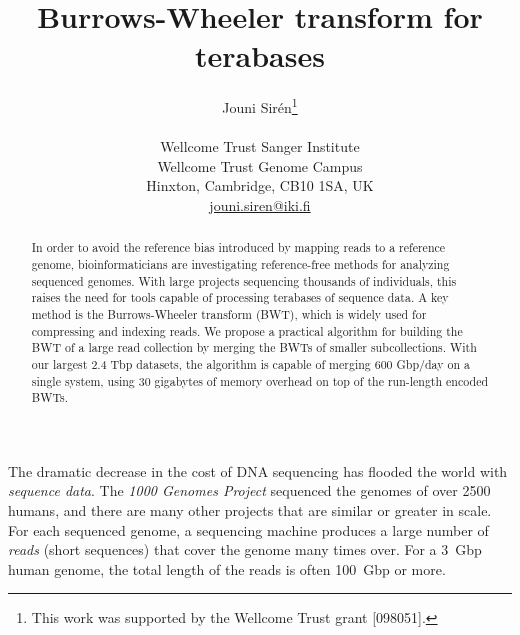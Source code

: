 \documentclass[smallabstract,smallcaptions]{dccpaper}
\begin{document}
\title
{\large
\textbf{Burrows-Wheeler transform for terabases}
}


\author{%
Jouni Sirén\thanks{This work was supported by the Wellcome Trust grant [098051].} \\[0.5em]
{\small\begin{minipage}{\linewidth}\begin{center}
\begin{tabular}{c}
Wellcome Trust Sanger Institute \\
Wellcome Trust Genome Campus \\
Hinxton, Cambridge, CB10 1SA, UK \\
\url{jouni.siren@iki.fi}
\end{tabular}
\end{center}\end{minipage}}
}


\maketitle
\thispagestyle{empty}


\begin{abstract}
In order to avoid the reference bias introduced by mapping reads to a reference genome, bioinformaticians are investigating reference-free methods for analyzing sequenced genomes. With large projects sequencing thousands of individuals, this raises the need for tools capable of processing terabases of sequence data. A key method is the Burrows-Wheeler transform (BWT), which is widely used for compressing and indexing reads. We propose a practical algorithm for building the BWT of a large read collection by merging the BWTs of smaller subcollections. With our largest 2.4 Tbp datasets, the algorithm is capable of merging 600 Gbp/day on a single system, using 30 gigabytes of memory overhead on top of the run-length encoded BWTs.
\end{abstract}



The dramatic decrease in the cost of DNA sequencing has flooded the world with \emph{sequence data}. The \emph{1000 Genomes Project} \cite{1000GP2015} sequenced the genomes of over 2500 humans, and there are many other projects that are similar or greater in scale. For each sequenced genome, a sequencing machine produces a large number of \emph{reads} (short sequences) that cover the genome many times over. For a 3~Gbp human genome, the total length of the reads is often 100~Gbp or more.
\end{document}
